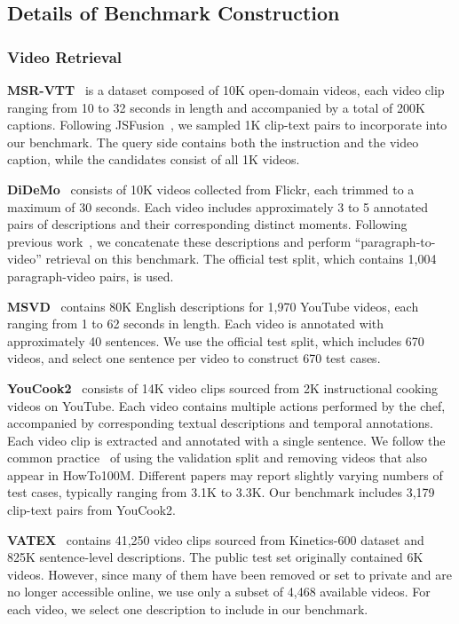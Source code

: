 \subsection{Details of Benchmark Construction}
\label{sec::appendix_dataset_details}

\subsubsection{Video Retrieval}
\textbf{MSR-VTT}~\citep{msrvtt} is a dataset composed of 10K open-domain videos, each video clip ranging from 10 to 32 seconds in length and accompanied by a total of 200K captions. Following JSFusion~\citep{yu2018joint}, we sampled 1K clip-text pairs to incorporate into our benchmark. The query side contains both the instruction and the video caption, while the candidates consist of all 1K videos.

\textbf{DiDeMo}~\citep{didemo} consists of 10K videos collected from Flickr, each trimmed to a maximum of 30 seconds. Each video includes approximately 3 to 5 annotated pairs of descriptions and their corresponding distinct moments. Following previous work~\citep{liu2019use,luo2021clip4clip}, we concatenate these descriptions and perform ``paragraph-to-video'' retrieval on this benchmark. The official test split, which contains 1,004 paragraph-video pairs, is used.

\textbf{MSVD}~\citep{msvd} contains 80K English descriptions for 1,970 YouTube videos, each ranging from 1 to 62 seconds in length. Each video is annotated with approximately 40 sentences. We use the official test split, which includes 670 videos, and select one sentence per video to construct 670 test cases.

\textbf{YouCook2}~\citep{youcook2} consists of 14K video clips sourced from 2K instructional cooking videos on YouTube. Each video contains multiple actions performed by the chef, accompanied by corresponding textual descriptions and temporal annotations. Each video clip is extracted and annotated with a single sentence. We follow the common practice~\citep{howto100m} of using the validation split and removing videos that also appear in HowTo100M. Different papers may report slightly varying numbers of test cases, typically ranging from 3.1K to 3.3K. Our benchmark includes 3,179 clip-text pairs from YouCook2.

\textbf{VATEX}~\citep{vatex} contains 41,250 video clips sourced from Kinetics-600 dataset and 825K sentence-level descriptions. The public test set originally contained 6K videos. However, since many of them have been removed or set to private and are no longer accessible online, we use only a subset of 4,468 available videos. For each video, we select one description to include in our benchmark.


